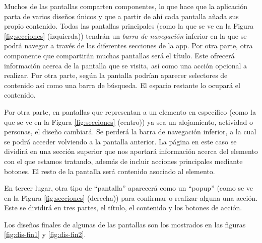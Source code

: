 Muchos de las pantallas comparten componentes, lo que hace que la aplicación parta de varios diseños únicos y que a partir de ahí cada pantalla añada sus propio contenido. Todas las pantallas principales (como la que se ve en la Figura \ref{fig:secciones} (izquierda)) tendrán un \textit{barra de navegación} inferior en la que se podrá navegar a través de las diferentes secciones de la app. Por otra parte, otra componente que compartirán muchas pantallas será el título. Este ofrecerá información acerca de la pantalla que se visita, así como una acción opcional a realizar. Por otra parte, según la pantalla podrían aparecer selectores de contenido así como una barra de búsqueda. El espacio restante lo ocupará el contenido.      

Por otra parte, en pantallas que representan a un elemento en específico (como la que se ve en la Figura \ref{fig:secciones} (centro)) ya sea un alojamiento, actividad o personas, el diseño cambiará. Se perderá la barra de navegación inferior, a la cual se podrá acceder volviendo a la pantalla anterior. La página en este caso se dividirá en una sección superior que nos aportará información acerca del elemento con el que estamos tratando, además de incluir acciones principales mediante botones. El resto de la pantalla será contenido asociado al elemento.

En tercer lugar, otra tipo de ``pantalla'' aparecerá como un ``popup'' (como se ve en la Figura \ref{fig:secciones} (derecha)) para confirmar o realizar alguna una acción. Este se dividirá en tres partes, el título, el contenido y los botones de acción.

Los diseños finales de algunas de las pantallas son los mostrados en las figuras \ref{fig:dis-fin1} y \ref{fig:dis-fin2}.

